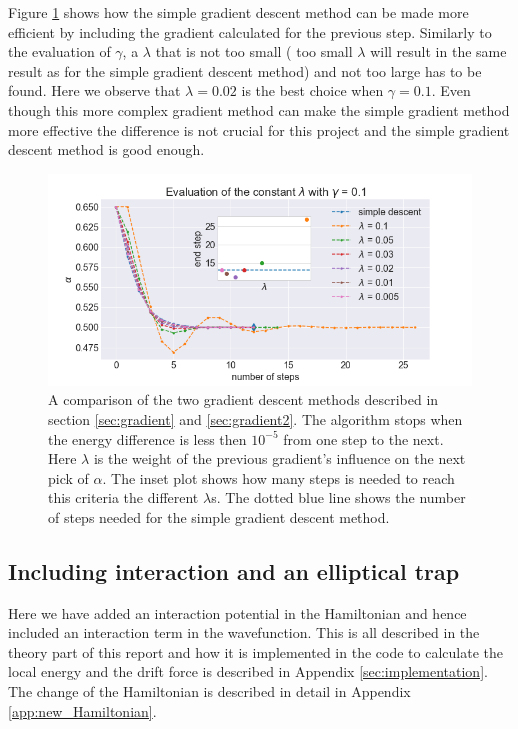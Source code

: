Figure \ref{fig:gradient_descent_lambda} shows how the simple gradient descent method can be made more efficient by including the gradient calculated for the previous step. Similarly to the evaluation of $\gamma$, a $\lambda$ that is not too small ( too small $\lambda$ will result in the same result as for the simple gradient descent method) and not too large has to be found. Here we observe that $\lambda = 0.02$ is the best choice when $\gamma = 0.1$. Even though this more complex gradient method can make the simple gradient method more effective the difference is not crucial for this project and the simple gradient descent method is good enough.

\begin{figure}[H]
\center
\includegraphics[width=0.8\linewidth]{../Results/comparing_gradient_descents.png}\caption{A comparison of the two gradient descent methods described in section \ref{sec:gradient} and \ref{sec:gradient2}. The algorithm stops when the energy difference is less then $10^{-5}$ from one step to the next. Here $\lambda$ is the weight of the previous gradient's influence on the next pick of $\alpha$. The inset plot shows how many steps is needed to reach this criteria the different $\lambda$s. The dotted blue line shows the number of steps needed for the simple gradient descent method.}\label{fig:gradient_descent_lambda}
\end{figure}



\subsection{Including interaction and an elliptical trap}

Here we have added an interaction potential in the Hamiltonian and hence included an interaction term in the wavefunction. This is all described in the theory part of this report and how it is implemented in the code to calculate the local energy and the drift force is described in Appendix \ref{sec:implementation}. The change of the Hamiltonian is described in detail in Appendix \ref{app:new_Hamiltonian}.

